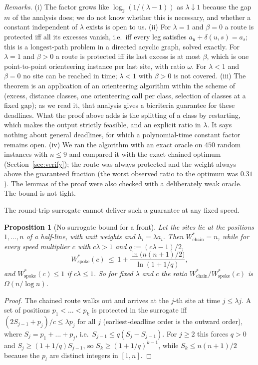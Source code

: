 \documentclass[pdflatex,sn-mathphys-ay]{sn-jnl}
\theoremstyle{thmstyleone}
\newtheorem{proposition}[theorem]{Proposition}
\theoremstyle{thmstyletwo}
\theoremstyle{thmstylethree}
\begin{document}
\emph{Remarks.} (i) The factor grows like $\log_2(1/(\lambda-1))$ as
$\lambda\downarrow1$ because the gap $m$ of the analysis does; we do not
know whether this is necessary, and whether a constant independent of
$\lambda$ exists is open to us. (ii) For $\lambda=1$ and
$\beta=0$ a route is protected iff all its excesses vanish, i.e.\ iff
every leg satisfies $a_u+\delta(u,s)=a_s$; this is a longest-path problem in a
directed acyclic graph, solved exactly. For $\lambda=1$ and $\beta>0$ a route
is protected iff its last excess is at most $\beta$, which is one point-to-point
orienteering instance per last site, with ratio $\omega$. For $\lambda<1$ and $\beta=0$ no site
can be reached in time; $\lambda<1$ with $\beta>0$ is not covered. (iii) The theorem is
an application of an orienteering algorithm within the scheme of
\citet{bansal2004} (excess, distance classes, one orienteering call per
class, selection of classes at a fixed gap); as we read it, that analysis gives
a bicriteria guarantee for these deadlines. What the proof above adds is the
splitting of a class by restarting, which makes the output strictly feasible,
and an explicit ratio in $\lambda$. It says nothing about general
deadlines, for which a polynomial-time constant factor remains open. (iv) We ran the algorithm with an exact oracle on $450$ random instances
with $n\le9$ and compared it with the exact chained optimum
(Section~\ref{sec:verify}); the route was always protected and the weight
always above the guaranteed fraction (the worst observed ratio to the
optimum was $0.31$). The lemmas of the proof were also checked with a
deliberately weak oracle. The bound is not tight.

The round-trip surrogate cannot deliver such a guarantee at any fixed speed.

\begin{proposition}[No surrogate bound for a front]\label{prop:nosurrogate}
Let the sites lie at the positions $1,\dots,n$ of a half-line, with unit
weights and $h_i=\lambda a_i$. Then $W^\ast_{\mathrm{chain}}=n$, while for every
speed multiplier $c$ with $c\lambda>1$ and $q:=(c\lambda-1)/2$,
\[
W^\ast_{\mathrm{spoke}}(c)\ \le\ 1+\frac{\ln\bigl(n(n+1)/2\bigr)}{\ln(1+1/q)} ,
\]
and $W^\ast_{\mathrm{spoke}}(c)\le1$ if $c\lambda\le1$. So for fixed $\lambda$ and $c$ the
ratio $W^\ast_{\mathrm{chain}}/W^\ast_{\mathrm{spoke}}(c)$ is $\Omega(n/\log n)$.
\end{proposition}

\begin{proof}
The chained route walks out and arrives at the $j$-th site at time $j\le\lambda j$.
A set of positions $p_1<\dots<p_k$ is protected in the surrogate iff
$(2S_{j-1}+p_j)/c\le\lambda p_j$ for all $j$ (earliest-deadline order is the outward order),
where $S_j=p_1+\dots+p_j$, i.e.\ $S_{j-1}\le q(S_j-S_{j-1})$. For $j\ge2$ this
forces $q>0$ and $S_j\ge(1+1/q)S_{j-1}$, so $S_k\ge(1+1/q)^{k-1}$, while
$S_k\le n(n+1)/2$ because the $p_l$ are distinct integers in $[1,n]$.
\end{proof}
\end{document}
